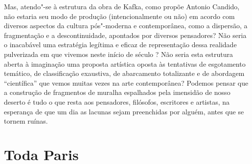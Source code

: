 Mas, atendo"-se à estrutura da obra de Kafka, como propõe Antonio
Candido, não estaria seu modo de produção (intencionalmente ou não) em
acordo com diversos aspectos da cultura pós"-moderna e contemporânea, como
a dispersão, a fragmentação e a descontinuidade, apontados por diversos
pensadores? Não seria o inacabável uma estratégia legítima e eficaz de
representação dessa realidade pulverizada em que vivemos neste início de
século ? Não seria esta estrutura aberta à imaginação uma proposta
artística oposta às tentativas de esgotamento temático, de classificação
exaustiva, de abarcamento totalizante e de abordagem ``científica'' que
vemos muitas vezes na arte contemporânea? Podemos pensar que a
construção de fragmentos de muralha espalhados pela imensidão de nosso
deserto é tudo o que resta aos pensadores, filósofos, escritores e
artistas, na esperança de que um dia as lacunas sejam preenchidas por
alguém, antes que se tornem ruínas.

\chapter{Toda Paris}

